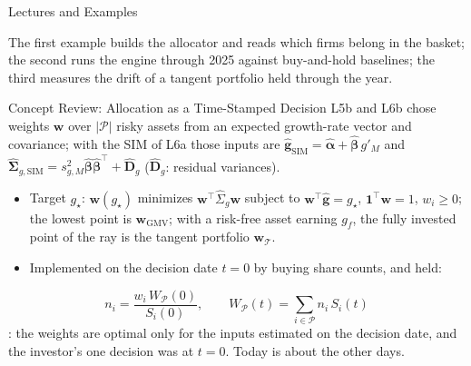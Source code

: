 \documentclass[aspectratio=169,11pt]{beamer}
\newcommand{\bg}{\mathbf{g}}
\newcommand{\bw}{\mathbf{w}}
\newcommand{\bal}{\boldsymbol{\alpha}}
\newcommand{\bbe}{\boldsymbol{\beta}}
\newcommand{\Tan}{\mathcal{T}}
\newcommand{\WP}{W_{\mathcal{P}}}
\newcommand{\np}{|\mathcal P|}
\newcommand{\SigSIM}{\hat{\boldsymbol{\Sigma}}_{g,\mathrm{SIM}}}
\newcommand{\gSIM}{\hat{\bg}_{\mathrm{SIM}}}
\begin{document}
\begin{frame}{Lectures and Examples}
  \vspace{0.3em}
  {\normalsize\textbf{}\par
  }

  \vspace{0.6em}
  {\normalsize\textbf{}\par
  }

  \vspace{0.6em}
  {\normalsize\textbf{}\par
  }

  \vspace{0.6em}
  {\normalsize\textbf{}\par
  }

  \vspace{0.5em}
  The first example builds the allocator and reads which firms belong in the
  basket; the second runs the engine through 2025 against buy-and-hold baselines;
  the third measures the drift of a tangent portfolio held through the year.
\end{frame}

\begin{frame}{Concept Review: Allocation as a Time-Stamped Decision}
  L5b and L6b chose weights $\bw$ over $\np$ risky assets from an expected
  growth-rate vector and covariance; with the SIM of L6a those inputs are
  $\gSIM=\hat{\bal}+\hat{\bbe}\,g'_M$ and
  $\SigSIM=s^2_{g,M}\hat{\bbe}\hat{\bbe}^{\top}+\hat{\mathbf D}_g$
  ($\hat{\mathbf D}_g$: residual variances).
  \begin{itemize}\setlength{\itemsep}{0.3em}
    \item Target $g_\star$: $\bw(g_\star)$ minimizes $\bw^{\top}\hat{\Sigma}_g\bw$
      subject to $\bw^{\top}\hat{\bg}=g_\star$, $\mathbf 1^{\top}\bw=1$, $w_i\ge0$;
      the lowest point is $\bw_{\mathrm{GMV}}$; with a risk-free asset earning
      $g_f$, the fully invested point of the ray is the tangent portfolio $\bw_{\Tan}$.
    \item Implemented on the decision date $t=0$ by buying share counts, and held:
  \end{itemize}
  \[
    n_i=\frac{w_i\,\WP(0)}{S_i(0)},\qquad
    \WP(t)=\sum_{i\in\mathcal P}n_i\,S_i(t)
  \]
  : the weights are optimal only for the
  inputs estimated on the decision date, and the investor's one decision was at
  $t=0$. Today is about the other days.
\end{frame}
\end{document}
